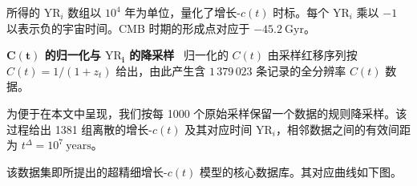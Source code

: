 \documentclass[12pt,leqno]{article}
\begin{document}
	\medskip
	所得的 $\mathrm{YR}_i$ 数组以 $10^4$ 年为单位，量化了增长-$c(t)$ 时标。每个 $\mathrm{YR}_i$ 乘以 $-1$ 以表示负的宇宙时间。CMB 时期的形成点对应于 $-45.2\ \mathrm{Gyr}$。
	\medskip
	
	
	\bigskip
	{\bf $\boldsymbol{C(t)}$ 的归一化与 $\boldsymbol{\mathrm{YR}_i}$ 的降采样}\,\,\,
	归一化的 $C(t)$ 由采样红移序列按 $C(t) = 1/(1+z_t)$ 给出，由此产生含 $1\,379\,023$ 条记录的全分辨率 $C(t)$ 数据。
	
	\medskip
	为便于在本文中呈现，我们按每 1000 个原始采样保留一个数据的规则降采样。该过程给出 1381 组离散的增长-$c(t)$ 及其对应时间 $\mathrm{YR}_i$，相邻数据之间的有效间距为 $t^\Delta = 10^7\ \mathrm{years}$。
	
	\medskip
	该数据集即所提出的超精细增长-$c(t)$ 模型的核心数据库。其对应曲线如下图。
	\bigskip
	
\end{document}
